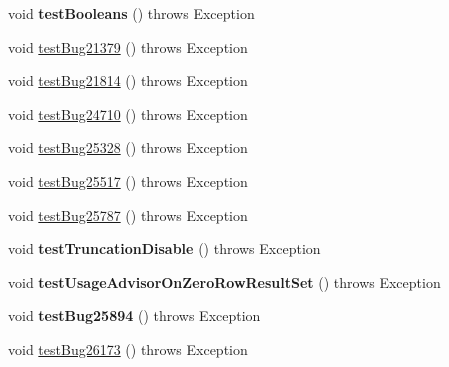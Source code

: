 \begin{DoxyCompactItemize}
\item 
\mbox{\label{classtestsuite_1_1regression_1_1_result_set_regression_test_ad371e7e2f3ccd917443053e73542439d}} 
void {\bfseries test\+Booleans} ()  throws Exception 
\item 
void \mbox{\hyperlink{classtestsuite_1_1regression_1_1_result_set_regression_test_a0e70ddab19727d4cb909e12706e43cff}{test\+Bug21379}} ()  throws Exception 
\item 
void \mbox{\hyperlink{classtestsuite_1_1regression_1_1_result_set_regression_test_a13c63c3fff5de437e9d908260d7edff8}{test\+Bug21814}} ()  throws Exception 
\item 
void \mbox{\hyperlink{classtestsuite_1_1regression_1_1_result_set_regression_test_a5ac3cc852f40725510fa770bc496ae90}{test\+Bug24710}} ()  throws Exception 
\item 
void \mbox{\hyperlink{classtestsuite_1_1regression_1_1_result_set_regression_test_a6186125e90deee1db033aeb3cfe20a47}{test\+Bug25328}} ()  throws Exception 
\item 
void \mbox{\hyperlink{classtestsuite_1_1regression_1_1_result_set_regression_test_a70caaccac8b8006475747f9481a529af}{test\+Bug25517}} ()  throws Exception 
\item 
void \mbox{\hyperlink{classtestsuite_1_1regression_1_1_result_set_regression_test_ac301a606f76010d277f5daf49e296b01}{test\+Bug25787}} ()  throws Exception 
\item 
\mbox{\label{classtestsuite_1_1regression_1_1_result_set_regression_test_ad69ed75a3e108acae96519abfdfd6de6}} 
void {\bfseries test\+Truncation\+Disable} ()  throws Exception 
\item 
\mbox{\label{classtestsuite_1_1regression_1_1_result_set_regression_test_a9a179a9951b69e2e8b0d914aef3ac482}} 
void {\bfseries test\+Usage\+Advisor\+On\+Zero\+Row\+Result\+Set} ()  throws Exception 
\item 
\mbox{\label{classtestsuite_1_1regression_1_1_result_set_regression_test_ae96bf431292ca3dc0ee61559038d7cf0}} 
void {\bfseries test\+Bug25894} ()  throws Exception 
\item 
void \mbox{\hyperlink{classtestsuite_1_1regression_1_1_result_set_regression_test_afa0bbccee8e4bffb0576ef3c0cd096f0}{test\+Bug26173}} ()  throws Exception 

\end{DoxyCompactItemize}
